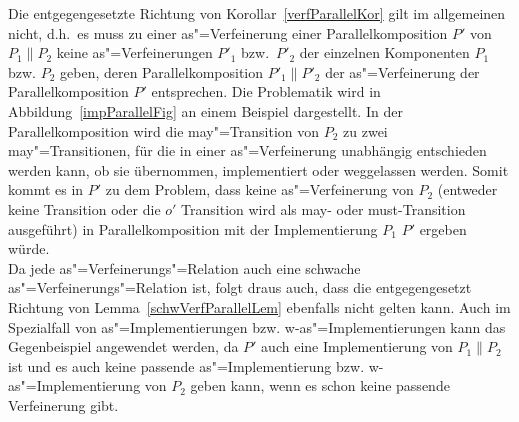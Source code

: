 Die entgegengesetzte Richtung von Korollar~\ref{verfParallelKor} gilt im
allgemeinen nicht, d.h.\ es muss zu einer as"=Verfeinerung einer
Parallelkomposition $P'$ von $P_1\|P_2$ keine as"=Verfeinerungen $P'_1$ bzw.\
$P'_2$ der einzelnen Komponenten $P_1$ bzw. $P_2$ geben, deren
Parallelkomposition $P'_1\|P'_2$ der as"=Verfeinerung der Parallelkomposition
$P'$ entsprechen. Die Problematik wird in Abbildung~\ref{impParallelFig} an
einem Beispiel dargestellt. In der Parallelkomposition wird die may"=Transition
von $P_2$ zu zwei may"=Transitionen, für die in einer as"=Verfeinerung
unabhängig entschieden werden kann, ob sie übernommen, implementiert oder
weggelassen werden. Somit kommt es in $P'$ zu dem Problem, dass keine
as"=Verfeinerung von $P_2$ (entweder keine Transition oder die $o'$ Transition
wird als may- oder must-Transition ausgeführt) in Parallelkomposition mit der
Implementierung $P_1$ $P'$ ergeben würde.\\
Da jede as"=Verfeinerungs"=Relation auch eine schwache
as"=Verfeinerungs"=Relation ist, folgt draus auch, dass die entgegengesetzt
Richtung von Lemma~\ref{schwVerfParallelLem} ebenfalls nicht gelten kann. Auch
im Spezialfall von as"=Implementierungen bzw. w-as"=Implementierungen kann das
Gegenbeispiel angewendet werden, da $P'$ auch eine Implementierung von
$P_1\|P_2$ ist und es auch keine passende as"=Implementierung bzw.
w-as"=Implementierung von $P_2$ geben kann, wenn es schon keine passende
Verfeinerung gibt.


